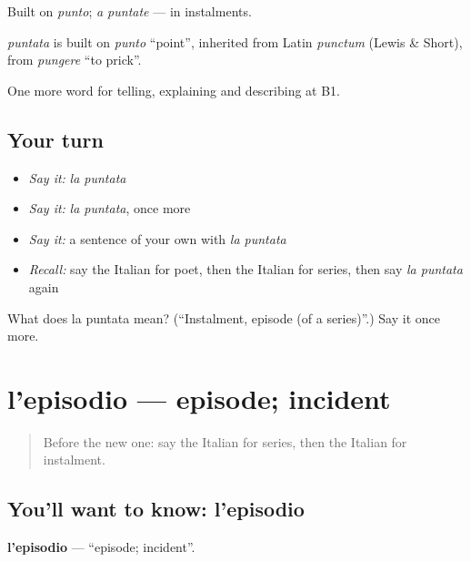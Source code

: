 Built on \emph{punto}; \emph{a puntate} — in instalments.

\begin{cousinweb}
\emph{puntata} is built on \emph{punto} \textquotedblleft{}point\textquotedblright{}, inherited from Latin \emph{punctum} (Lewis \& Short), from \emph{pungere} \textquotedblleft{}to prick\textquotedblright{}.
\end{cousinweb}

\begin{grammarlens}[title={What you've built}]
One more word for telling, explaining and describing at B1.
\end{grammarlens}

\subsection*{Your turn}
\begin{itemize}
\raggedright
  \item \emph{Say it:} \emph{la puntata}
  \item \emph{Say it:} \emph{la puntata}, once more
  \item \emph{Say it:} a sentence of your own with \emph{la puntata}
  \item \emph{Recall:} say the Italian for poet, then the Italian for series, then say \emph{la puntata} again
\end{itemize}

\begin{tcolorbox}[breakable,colback=teal!4,colframe=teal!35!black,title={Before you move on}]
What does la puntata mean? (\textquotedblleft{}Instalment, episode (of a series)\textquotedblright{}.) Say it once more.
\end{tcolorbox}
\section[l'episodio]{l'episodio — episode; incident}

\label{lesson:IT-C528-episodio}



\begin{quote}
Before the new one: say the Italian for series, then the Italian for instalment.
\end{quote}

\subsection*{You'll want to know: l'episodio}
\textbf{l'episodio} — \textquotedblleft{}episode; incident\textquotedblright{}.

